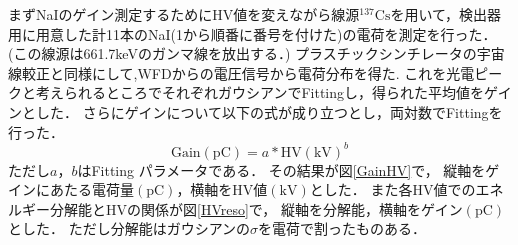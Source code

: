 まずNaIのゲイン測定するためにHV値を変えながら線源$^{137}\mathrm{Cs}$を用いて，検出器用に用意した計11本のNaI(1から順番に番号を付けた)の電荷を測定を行った．
(この線源は661.7keVのガンマ線を放出する．\cite{IAEA_ENSDF})
プラスチックシンチレータの宇宙線較正と同様にして,WFDからの電圧信号から電荷分布を得た.
これを光電ピークと考えられるところでそれぞれガウシアンでFittingし，得られた平均値をゲインとした．
さらにゲインについて以下の式が成り立つとし，両対数でFittingを行った．\cite{Hamamatsu_PMT}
\begin{equation}
\mathrm{Gain}(\mathrm{pC})=a*\mathrm{HV}(\mathrm{kV})^b \label{gain_curve}  
\end{equation}
ただし$a， b$はFitting パラメータである．
その結果が図\ref{GainHV}で，
縦軸をゲインにあたる電荷量$(\mathrm{pC})$，横軸をHV値$(\mathrm{kV})$とした．
また各HV値でのエネルギー分解能とHVの関係が図\ref{HVreso}で，
縦軸を分解能，横軸をゲイン$(\mathrm{pC})$とした．
ただし分解能はガウシアンの$\sigma$を電荷で割ったものある．
